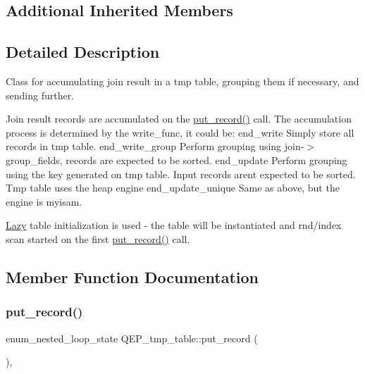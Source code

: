 \subsection*{Additional Inherited Members}


\subsection{Detailed Description}
Class for accumulating join result in a tmp table, grouping them if necessary, and sending further. 

Join result records are accumulated on the \mbox{\hyperlink{classQEP__tmp__table_ad402039d362a460ab3b4f7035cd843ce}{put\+\_\+record()}} call. The accumulation process is determined by the write\+\_\+func, it could be\+: end\+\_\+write Simply store all records in tmp table. end\+\_\+write\+\_\+group Perform grouping using join-\/$>$group\+\_\+fields, records are expected to be sorted. end\+\_\+update Perform grouping using the key generated on tmp table. Input records aren\textquotesingle{}t expected to be sorted. Tmp table uses the heap engine end\+\_\+update\+\_\+unique Same as above, but the engine is myisam.

\mbox{\hyperlink{classLazy}{Lazy}} table initialization is used -\/ the table will be instantiated and rnd/index scan started on the first \mbox{\hyperlink{classQEP__tmp__table_ad402039d362a460ab3b4f7035cd843ce}{put\+\_\+record()}} call. 

\subsection{Member Function Documentation}
\mbox{\label{classQEP__tmp__table_ad402039d362a460ab3b4f7035cd843ce}} 
\subsubsection{\texorpdfstring{put\+\_\+record()}{put\_record()}}
{\footnotesize\ttfamily enum\+\_\+nested\+\_\+loop\+\_\+state Q\+E\+P\+\_\+tmp\+\_\+table\+::put\+\_\+record (\begin{DoxyParamCaption}{ }\end{DoxyParamCaption})\hspace{0.3cm}{\ttfamily [inline]}, {\ttfamily [virtual]}}

